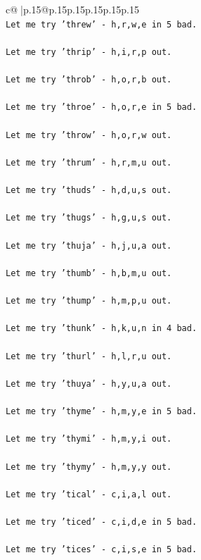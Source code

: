 \documentclass{article}
\begin{document}
{\begin{supertabular}{c@{$\;$}|p{.15\linewidth}@{}p{.15\linewidth}p{.15\linewidth}p{.15\linewidth}p{.15\linewidth}p{.15\linewidth}}
{{{\\ 
\texttt{Let me try 'threw' {-} h,r,w,e in 5 bad. } \\
\\ 
\texttt{Let me try 'thrip' {-} h,i,r,p out. } \\
\\ 
\texttt{Let me try 'throb' {-} h,o,r,b out. } \\
\\ 
\texttt{Let me try 'throe' {-} h,o,r,e in 5 bad. } \\
\\ 
\texttt{Let me try 'throw' {-} h,o,r,w out. } \\
\\ 
\texttt{Let me try 'thrum' {-} h,r,m,u out. } \\
\\ 
\texttt{Let me try 'thuds' {-} h,d,u,s out. } \\
\\ 
\texttt{Let me try 'thugs' {-} h,g,u,s out. } \\
\\ 
\texttt{Let me try 'thuja' {-} h,j,u,a out. } \\
\\ 
\texttt{Let me try 'thumb' {-} h,b,m,u out. } \\
\\ 
\texttt{Let me try 'thump' {-} h,m,p,u out. } \\
\\ 
\texttt{Let me try 'thunk' {-} h,k,u,n in 4 bad. } \\
\\ 
\texttt{Let me try 'thurl' {-} h,l,r,u out. } \\
\\ 
\texttt{Let me try 'thuya' {-} h,y,u,a out. } \\
\\ 
\texttt{Let me try 'thyme' {-} h,m,y,e in 5 bad. } \\
\\ 
\texttt{Let me try 'thymi' {-} h,m,y,i out. } \\
\\ 
\texttt{Let me try 'thymy' {-} h,m,y,y out. } \\
\\ 
\texttt{Let me try 'tical' {-} c,i,a,l out. } \\
\\ 
\texttt{Let me try 'ticed' {-} c,i,d,e in 5 bad. } \\
\\ 
\texttt{Let me try 'tices' {-} c,i,s,e in 5 bad. } \\
}}}
\end{supertabular}}
\end{document}
